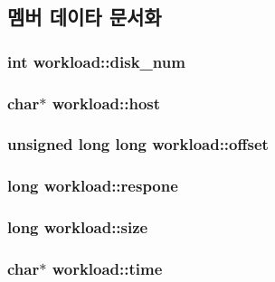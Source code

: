 \subsection{멤버 데이타 문서화}
\hypertarget{structworkload_ac5fbfd8a1e652dc2b6e742ce685eb1fa}{
\subsubsection[{disk\+\_\+num}]{\setlength{\rightskip}{0pt plus 5cm}int workload\+::disk\+\_\+num}}\label{structworkload_ac5fbfd8a1e652dc2b6e742ce685eb1fa}
\hypertarget{structworkload_a3d757b51dfb82980f5a979a97bf0dfa1}{
\subsubsection[{host}]{\setlength{\rightskip}{0pt plus 5cm}char$\ast$ workload\+::host}}\label{structworkload_a3d757b51dfb82980f5a979a97bf0dfa1}
\hypertarget{structworkload_abd28363163e81923118bfcef6776b746}{
\subsubsection[{offset}]{\setlength{\rightskip}{0pt plus 5cm}unsigned long long workload\+::offset}}\label{structworkload_abd28363163e81923118bfcef6776b746}
\hypertarget{structworkload_a8de001cbb458db8f4502435a2a6c2030}{
\subsubsection[{respone}]{\setlength{\rightskip}{0pt plus 5cm}long workload\+::respone}}\label{structworkload_a8de001cbb458db8f4502435a2a6c2030}
\hypertarget{structworkload_aacbafed05a09d7d81c17345909a9dc5d}{
\subsubsection[{size}]{\setlength{\rightskip}{0pt plus 5cm}long workload\+::size}}\label{structworkload_aacbafed05a09d7d81c17345909a9dc5d}
\hypertarget{structworkload_a4401c89ba5cdd383f04301470e163cfd}{
\subsubsection[{time}]{\setlength{\rightskip}{0pt plus 5cm}char$\ast$ workload\+::time}}\label{structworkload_a4401c89ba5cdd383f04301470e163cfd}
